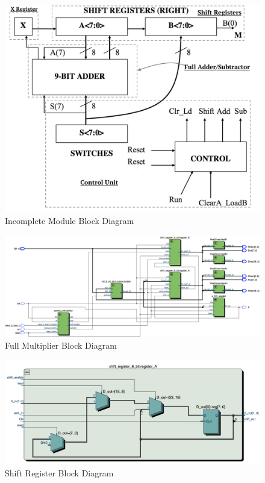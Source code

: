 \documentclass[journal, twocolumn, final,11pt,letterpaper]{IEEEtran}
\begin{document}
\begin{figure} [htbp]
	\centering
	\includegraphics[scale=0.6]{Block_Diagram.png}
	\caption{Incomplete Module Block Diagram\label{fig:block-diagram}}
\end{figure}

\begin{figure} [htbp]
	\centering
	\includegraphics[scale=0.4]{full-multiplier-diagram.png}
	\caption{Full Multiplier Block Diagram\label{fig:full-multiplier-diagram}}
\end{figure}

\begin{figure} [htbp]
	\centering
	\includegraphics[scale=0.5]{shift-register-diagram.png}
	\caption{Shift Register Block Diagram\label{fig:shift-register-diagram}}
\end{figure}
\end{document}
